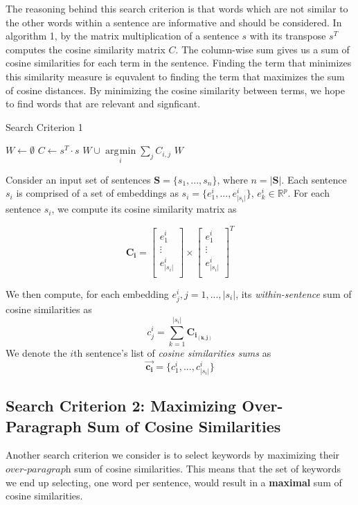 \documentclass[12pt]{article}
\DeclareMathOperator*{\argmin}{\arg\!\min}
\begin{document}
The reasoning behind this search criterion is that words which are not similar to the other words within a sentence are informative and should be considered. In algorithm 1, by the matrix multiplication of a sentence $s$ with its transpose $s^T$ computes the cosine similarity matrix $C$. The column-wise sum gives us a sum of cosine similarities for each term in the sentence. Finding the term that minimizes this similarity measure is equvalent to finding the term that maximizes the sum of cosine distances. By minimizing the cosine similarity between terms, we hope to find words that are relevant and signficant.

\begin{algorithm}[H]
\caption{Search Criterion 1}\label{euclid}
\begin{algorithmic}[1]
\State $W \gets \emptyset $
\State $ C \gets s^ T \cdot s$
\State $ W \cup \argmin\limits_{i} \sum\limits_{j} C_{i,j}$
\State
\EndFor
\State \Return $W$
\EndProcedure
\end{algorithmic}
\end{algorithm}

Consider an input set of sentences $\bm{S} = \{s_1, ..., s_n\}$, where $n = |\bm{S}|$. Each sentence $s_i$ is comprised of a set of embeddings as $s_i = \{e^{i}_{1}, ..., e^{i}_{|s_i|}\}$,  $e^{i}_{k} \in \mathbb{R}^{p}$. For each sentence $s_i$, we compute its cosine similarity matrix as 

\[\bm{C_i} = \begin{bmatrix}
         e^{i}_{1} \\
         \vdots \\
         e^{i}_{|s_i|} \\
        \end{bmatrix} \times  \begin{bmatrix}
         e^{i}_{1} \\
         \vdots \\
         e^{i}_{|s_i|} \\
        \end{bmatrix}^{T}\] 

We then compute, for each embedding $e^{i}_{j}, j = 1,...,|s_i|$, its \textit{within-sentence} sum of cosine similarities as 
\[ c^{i}_{j} = \sum^{|s_i|}_{k=1} \bm{C_{i{_{(k,j)}}}}\]
We denote the $i$th sentence's list of \textit{cosine similarities sums} as 
\[\bm{\vec{c_i}} = \{ c^{i}_{1}, ...,  c^{i}_{|s_i|}\}\]


\subsection{Search Criterion 2: Maximizing Over-Paragraph Sum of Cosine Similarities}
Another search criterion we consider is to select keywords by maximizing their $\textit{over-paragraph}$ sum of cosine similarities. This means that the set of keywords we end up selecting, one word per sentence, would result in a \textbf{maximal} sum of cosine similarities.
\end{document}
